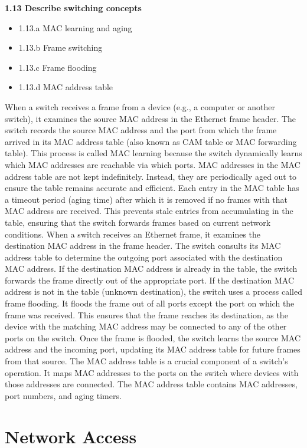 \documentclass{article}
\begin{document}
\noindent\textbf{1.13 Describe switching concepts}
\begin{itemize}
\item 1.13.a MAC learning and aging
\item 1.13.b Frame switching
\item 1.13.c Frame flooding
\item 1.13.d MAC address table
\end{itemize}

	When a switch receives a frame from a device (e.g., a computer or another switch), it examines the source MAC address in the Ethernet frame header. The switch records the source MAC address and the port from which the frame arrived in its MAC address table (also known as CAM table or MAC forwarding table). This process is called MAC learning because the switch dynamically learns which MAC addresses are reachable via which ports. MAC addresses in the MAC address table are not kept indefinitely. Instead, they are periodically aged out to ensure the table remains accurate and efficient. Each entry in the MAC table has a timeout period (aging time) after which it is removed if no frames with that MAC address are received. This prevents stale entries from accumulating in the table, ensuring that the switch forwards frames based on current network conditions. When a switch receives an Ethernet frame, it examines the destination MAC address in the frame header. The switch consults its MAC address table to determine the outgoing port associated with the destination MAC address. If the destination MAC address is already in the table, the switch forwards the frame directly out of the appropriate port. If the destination MAC address is not in the table (unknown destination), the switch uses a process called frame flooding. It floods the frame out of all ports except the port on which the frame was received. This ensures that the frame reaches its destination, as the device with the matching MAC address may be connected to any of the other ports on the switch. Once the frame is flooded, the switch learns the source MAC address and the incoming port, updating its MAC address table for future frames from that source. The MAC address table is a crucial component of a switch's operation. It maps MAC addresses to the ports on the switch where devices with those addresses are connected. The MAC address table contains MAC addresses, port numbers, and aging timers.

\section{Network Access}
\end{document}

